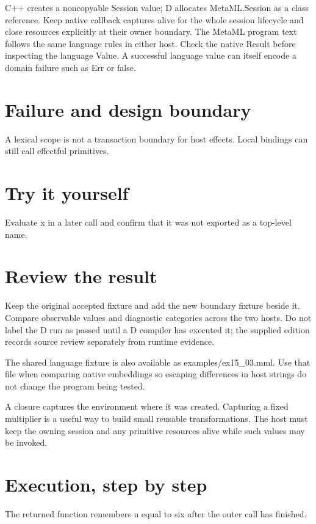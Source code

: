 \clearpage
{}
C++ creates a noncopyable Session value; D allocates MetaML.Session as a class reference. Keep native callback captures alive for the whole session lifecycle and close resources explicitly at their owner boundary. The MetaML program text follows the same language rules in either host. Check the native Result before inspecting the language Value. A successful language value can itself encode a domain failure such as Err or false.


\section*{Failure and design boundary}
A lexical scope is not a transaction boundary for host effects. Local bindings can still call effectful primitives.

\section*{Try it yourself}
Evaluate x in a later call and confirm that it was not exported as a top-level name.

\section*{Review the result}
Keep the original accepted fixture and add the new boundary fixture beside it. Compare observable values and diagnostic categories across the two hosts. Do not label the D run as passed until a D compiler has executed it; the supplied edition records source review separately from runtime evidence.

The shared language fixture is also available as examples/ex15\_03.mml. Use that file when comparing native embeddings so escaping differences in host strings do not change the program being tested.

\clearpage
{}
A closure captures the environment where it was created. Capturing a fixed multiplier is a useful way to build small reusable transformations. The host must keep the owning session and any primitive resources alive while such values may be invoked.


\section*{Execution, step by step}
The returned function remembers n equal to six after the outer call has finished.

